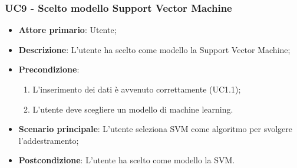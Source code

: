 \subsubsection{UC9 - Scelto modello Support Vector Machine}%
\label{sssec:uc9}
\begin{itemize}
  \item \textbf{Attore primario}: Utente;
  \item \textbf{Descrizione}: L'utente ha scelto come modello la Support Vector Machine;
  \item \textbf{Precondizione}:
  \begin{enumerate}
    \item L'inserimento dei dati è avvenuto correttamente (UC1.1);
    \item L'utente deve scegliere un modello di machine learning.
  \end{enumerate}
  \item \textbf{Scenario principale}: L'utente seleziona SVM come algoritmo per svolgere l'addestramento;
  \item \textbf{Postcondizione}: L'utente ha scelto come modello la SVM.
\end{itemize}
